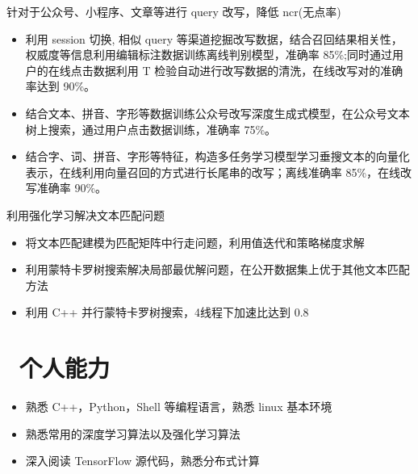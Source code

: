 \documentclass{resume}
\begin{document}
\begin{onehalfspacing}
针对于公众号、小程序、文章等进行 query 改写，降低 ncr(无点率)
\begin{itemize}
  \item 利用 session 切换, 相似 query 等渠道挖掘改写数据，结合召回结果相关性，权威度等信息利用编辑标注数据训练离线判别模型，准确率 85\%;同时通过用户的在线点击数据利用 T 检验自动进行改写数据的清洗，在线改写对的准确率达到 90\%。
  \item 结合文本、拼音、字形等数据训练公众号改写深度生成式模型，在公众号文本树上搜索，通过用户点击数据训练，准确率 75\%。
  \item 结合字、词、拼音、字形等特征，构造多任务学习模型学习垂搜文本的向量化表示，在线利用向量召回的方式进行长尾串的改写；离线准确率 85\%，在线改写准确率 90\%。
\end{itemize}
\end{onehalfspacing}


\begin{onehalfspacing}
利用强化学习解决文本匹配问题
\begin{itemize}
  \item 将文本匹配建模为匹配矩阵中行走问题，利用值迭代和策略梯度求解
  \item 利用蒙特卡罗树搜索解决局部最优解问题，在公开数据集上优于其他文本匹配方法
  \item 利用 C++ 并行蒙特卡罗树搜索，4线程下加速比达到 0.8
\end{itemize}
\end{onehalfspacing}


\section{\faCogs\ 个人能力}
\begin{itemize}[parsep=0.5ex]
  \item 熟悉 C++，Python，Shell 等编程语言，熟悉 linux 基本环境
  \item 熟悉常用的深度学习算法以及强化学习算法
  \item 深入阅读 TensorFlow 源代码，熟悉分布式计算
\end{itemize}
\end{document}
